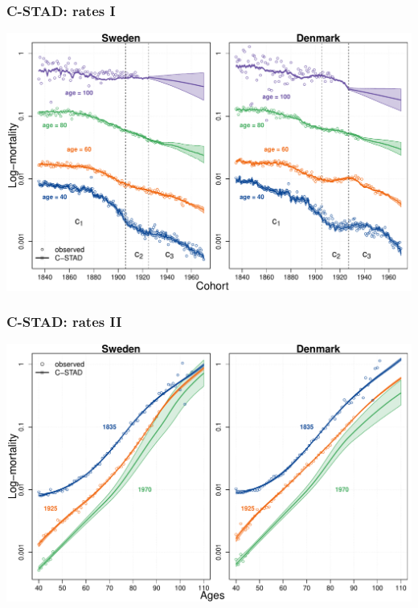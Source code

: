 \documentclass[12pt, xcolor=table]{beamer}  %
\begin{document}

\begin{frame}[noframenumbering]\frametitle{C-STAD: rates I}
	
	\vspace{-0.5cm}

	
	\begin{center}	
		\vspace{0.2cm}
		
		\includegraphics[scale=.42]{Figures/Ch4/F7a}
		
	\end{center}
	
\end{frame}

\begin{frame}[noframenumbering]\frametitle{C-STAD: rates II}
	
	\vspace{-0.5cm}
	
	\begin{center}	
		\vspace{0.2cm}
		
		\includegraphics[scale=.42]{Figures/Ch4/F7b}
		
	\end{center}
	
\end{frame}
\end{document}
